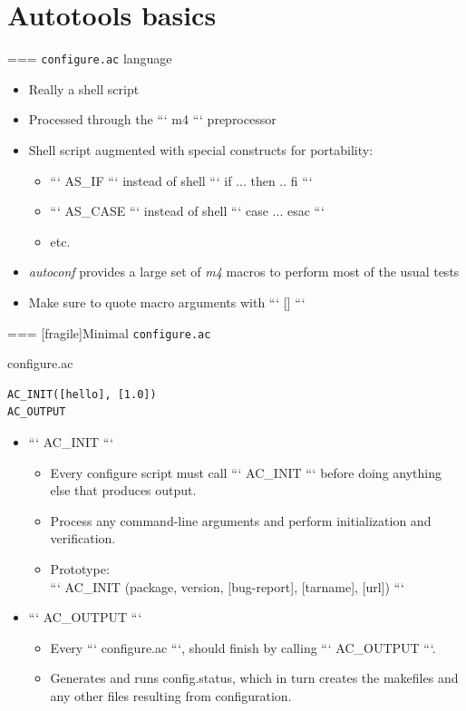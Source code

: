 
\section{Autotools basics}

=== {{\tt configure.ac} language}
  \begin{itemize}
  \item Really a shell script
  \item Processed through the ``` m4 ``` preprocessor
  \item Shell script augmented with special constructs for portability:
    \begin{itemize}
    \item ``` AS_IF ``` instead of shell ``` if ... then .. fi ```
    \item ``` AS_CASE ``` instead of shell ``` case ... esac ```
    \item etc.
    \end{itemize}
  \item {\em autoconf} provides a large set of {\em m4} macros to
    perform most of the usual tests
  \item Make sure to quote macro arguments with ``` [] ```
  \end{itemize}


=== [fragile]{Minimal {\tt configure.ac}}
  \begin{block}{configure.ac}
  \begin{verbatim}
AC_INIT([hello], [1.0])
AC_OUTPUT
  \end{verbatim}
  \end{block}
  \begin{itemize}
  \item ``` AC_INIT ```
    \begin{itemize}
    \item Every configure script must call ``` AC_INIT ``` before doing
      anything else that produces output.
    \item Process any command-line arguments and perform
      initialization and verification.
    \item Prototype:\\
      ``` AC_INIT (package, version, [bug-report], [tarname], [url]) ```
    \end{itemize}
  \item ``` AC_OUTPUT ```
    \begin{itemize}
    \item Every ``` configure.ac ```, should finish by calling
      ``` AC_OUTPUT ```.
    \item Generates and runs config.status, which in turn creates the
      makefiles and any other files resulting from configuration.
    \end{itemize}
  \end{itemize}


